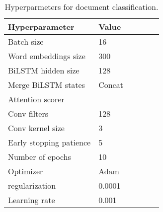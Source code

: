 \documentclass{article}
\begin{document}
\begin{comment}
For the continuous attention models, we normalize the document length  into the unit interval , with the  word positioned at , and we use  as the score function, leading to a 1D Gaussian () or a truncated parabola () as the attention density.  We compare three attention variants: 
{\bf discrete attention} \citep{bahdanau2014neural}, where  is obtained from a discrete softmax or sparsemax transformation and leads to a context vector ; 
{\bf continuous attention}, 
where a CNN and max-pooling over time 
yields a document representation  from which 
we compute  and , 
leading to a density  (continuous softmax) or 
 (continuous sparsemax), 
and a context vector , where  are Gaussian RBFs.  
Finally, {\bf combined attention} first uses discrete attention to compute  and  and then computes  and , proceeding with the continuous attention as before to get , and combining the two vectors as . Note that this combination does not increase the number of neural network parameters, compared to discrete attention. 
\end{comment}

\begin{table}[t]
    \caption{Hyperparmeters for document classification.}
    \label{tab:table_all_hyperparams}
    \begin{small}
    \begin{center}
    \begin{tabular}{llllll}
        \toprule
        \sc Hyperparameter & \sc Value  \\
        \midrule
        Batch size                  & 16    \\
        Word embeddings size        & 300     \\
        BiLSTM hidden size          & 128     \\
        Merge BiLSTM states         & Concat     \\
        Attention scorer            & \citep{bahdanau2014neural}     \\
        Conv filters                & 128   \\
        Conv kernel size            & 3     \\
        Early stopping patience     & 5     \\
        Number of epochs            & 10     \\
        Optimizer                   & Adam      \\
         regularization     & 0.0001     \\
        Learning rate               & 0.001     \\
        \bottomrule
    \end{tabular}
    \end{center}
    \end{small}
    \vskip -0.1in
\end{table}
\end{document}
